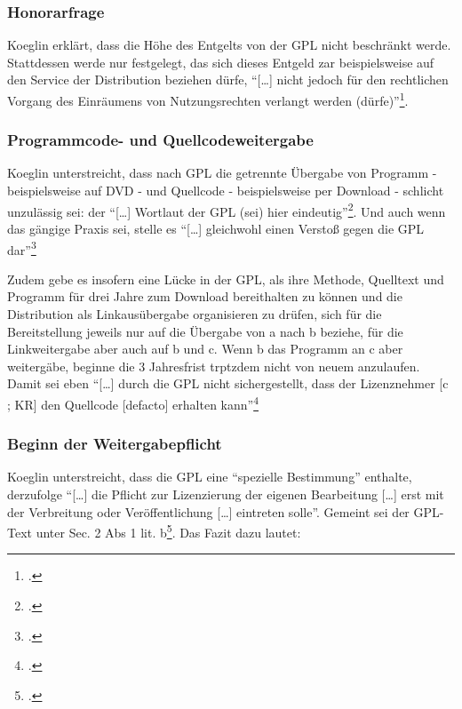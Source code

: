 \documentclass[DIV=calc,BCOR=5mm,11pt,headings=small,oneside,abstract=true, toc=bib]{scrartcl}
\begin{document}
\subsubsection{Honorarfrage}

Koeglin erklärt, dass die Höhe des Entgelts von der GPL nicht beschränkt werde.
Stattdessen werde nur festgelegt, das sich dieses Entgeld zar beispielsweise auf
den Service der Distribution beziehen dürfe, \enquote{[\ldots] nicht jedoch
für den rechtlichen Vorgang des Einräumens von Nutzungsrechten verlangt
werden (dürfe)}\footcite[vgl.][198]{Koglin2007a}.

\subsubsection{Programmcode- und Quellcodeweitergabe}

Koeglin unterstreicht, dass nach GPL die getrennte Übergabe von Programm -
beispielsweise auf DVD - und Quellcode - beispielsweise per Download - schlicht
unzulässig sei: der \enquote{[\ldots] Wortlaut der GPL (sei) hier
eindeutig}\footcite[vgl.][203]{Koglin2007a}. Und auch wenn das gängige
Praxis sei, stelle es \enquote{[\ldots] gleichwohl einen Verstoß gegen die GPL
dar}\footcite[vgl.][204]{Koglin2007a}

Zudem gebe es insofern eine Lücke in der GPL, als ihre Methode, Quelltext und
Programm für drei Jahre zum Download bereithalten zu können und die
Distribution als Linkausübergabe organisieren zu drüfen, sich für die
Bereitstellung jeweils nur auf die Übergabe von a nach b beziehe, für die
Linkweitergabe aber auch auf b und c. Wenn b das Programm an c aber weitergäbe,
beginne die 3 Jahresfrist trptzdem nicht von neuem anzulaufen. Damit sei eben
\enquote{[\ldots] durch die GPL nicht sichergestellt, dass der Lizenznehmer
[c ; KR] den Quellcode [defacto] erhalten
kann}\footcite[vgl.][205]{Koglin2007a}

\subsubsection{Beginn der Weitergabepflicht}

Koeglin unterstreicht, dass die GPL eine \enquote{spezielle Bestimmung}
enthalte, derzufolge \enquote{[\ldots] die Pflicht zur Lizenzierung der
eigenen Bearbeitung [\ldots] erst mit der Verbreitung oder
Veröffentlichung [\ldots] eintreten solle}. Gemeint sei der GPL-Text unter
Sec. 2 Abs 1 lit. b\footcite[vgl.][208]{Koglin2007a}. Das Fazit dazu lautet:
\end{document}
